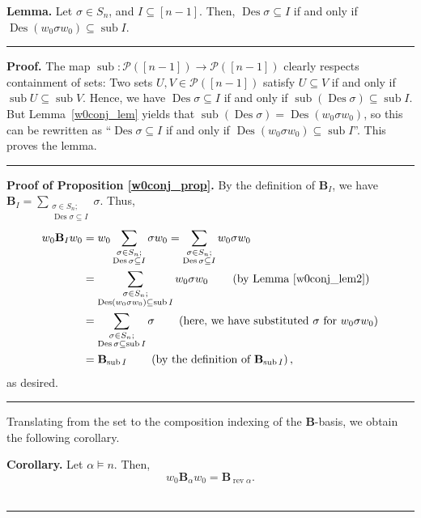 \documentclass[12pt]{article}
\theoremstyle{definition}%
\newtheorem{lem}[thm]{Lemma}
\newtheorem{cor}[thm]{Corollary}
\theoremstyle{definition}%
\theoremstyle{remark}%
\newcommand{\tup}[1]{\left( #1 \right)}
\newcommand{\interval}[1]{\left[ #1 \right]} %
\newcommand{\BB}{\mathbf{B}}
\newcommand{\BBa}{\mathbf{B}_{\alpha}}
\newcommand{\BBi}{\mathbf{B}_{I}}
\newcommand{\wo}{w_0} %
\newcommand{\Des}{\operatorname{Des}}
\newcommand{\sub}{\operatorname{sub}}
\newcommand{\rev}{\operatorname{rev}}
\newenvironment{lem}[1][Lemma]{\noindent\textbf{#1.} }{\ \rule{0.5em}{0.5em}}
\newenvironment{cor}[1][Corollary]{\noindent\textbf{#1.} }{\ \rule{0.5em}{0.5em}}
\newenvironment{proof}[1][Proof]{\noindent\textbf{#1.} }{\ \rule{0.5em}{0.5em}}
\begin{document}
\begin{lem}
    \label{w0conj_lem2}
    Let $\sigma \in S_n$, and $I \subseteq \interval{n-1}$.
    Then, $\Des \sigma \subseteq I$ if and only if $\Des \tup{\wo \sigma \wo} \subseteq \sub I$.
\end{lem}

\begin{proof}
    The map $\sub : \mathcal{P}\tup{\interval{n-1}} \to \mathcal{P}\tup{\interval{n-1}}$ clearly respects containment of sets: Two sets $U, V \in \mathcal{P}\tup{\interval{n-1}}$ satisfy $U \subseteq V$ if and only if $\sub U \subseteq \sub V$.
    Hence, we have $\Des \sigma \subseteq I$ if and only if $\sub \tup{\Des \sigma} \subseteq \sub I$. But Lemma~\ref{w0conj_lem} yields that $\sub \tup{\Des \sigma} = \Des \tup{\wo \sigma \wo}$,
    so this can be rewritten as ``$\Des \sigma \subseteq I$ if and only if $\Des \tup{\wo \sigma \wo} \subseteq \sub I$''.
    This proves the lemma.
\end{proof}

\begin{proof}[Proof of Proposition \ref{w0conj_prop}]
    By the definition of $\BBi$, we have $\BBi = \sum_{\substack{\sigma \in S_n; \\ \Des \sigma \subseteq I}} \sigma$. Thus,
   \begin{align*}
       \wo \BBi \wo
        &= \wo \sum_{\substack{\sigma \in S_n; \\ \Des \sigma \subseteq I}} \sigma \wo
        = \sum_{\substack{\sigma \in S_n; \\ \Des \sigma \subseteq I}} \wo \sigma \wo \\
        &= \sum_{\substack{\sigma \in S_n; \\ \Des \tup{ \wo \sigma \wo}  \subseteq \sub I}} \wo \sigma \wo
        \qquad \tup{\text{by Lemma \ref{w0conj_lem2}}} \\
        &= \sum_{\substack{\sigma \in S_n; \\ \Des \sigma  \subseteq \sub I}} \sigma
        \qquad \tup{\text{here, we have substituted $\sigma$ for $\wo \sigma \wo$}}
        \\
        &= \BB_{\sub I} \qquad \tup{\text{by the definition of $\BB_{\sub I}$}},
   \end{align*}
   as desired.
\end{proof}

Translating from the set to the composition indexing of the $ \BB $-basis, we obtain the following corollary.

\begin{cor}
    \label{cor.woBBawo}
    Let $\alpha \models n$. Then,
    \[
    \wo \BBa \wo = \BB_{\rev \alpha}.
    \]
\end{cor}
\end{document}
